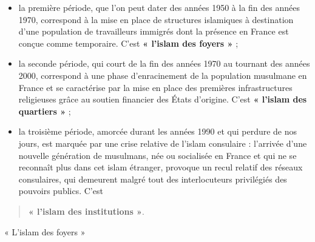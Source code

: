 \begin{itemize}
\item
  la première période, que l'on peut dater des années 1950 à la fin des
  années 1970, correspond à la mise en place de structures islamiques à
  destination d'une population de travailleurs immigrés dont la présence
  en France est conçue comme temporaire. C'est \textbf{« l'islam des
  foyers »} ;
\item
  la seconde période, qui court de la fin des années 1970 au tournant
  des années 2000, correspond à une phase d'enracinement de la
  population musulmane en France et se caractérise par la mise en place
  des premières infrastructures religieuses grâce au soutien financier
  des États d'origine. C'est \textbf{« l'islam des quartiers »} ;
\item
  la troisième période, amorcée durant les années 1990 et qui perdure de
  nos jours, est marquée par une crise relative de l'islam consulaire :
  l'arrivée d'une nouvelle génération de musulmans, née ou socialisée en
  France et qui ne se reconnaît plus dans cet islam étranger, provoque
  un recul relatif des réseaux consulaires, qui demeurent malgré tout
  des interlocuteurs privilégiés des pouvoirs publics. C'est
\end{itemize}

\begin{quote}
\textbf{« l'islam des institutions »}.
\end{quote}

« L'islam des foyers »

